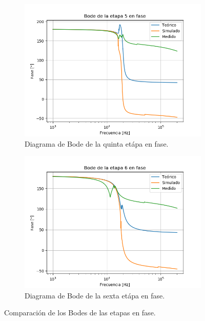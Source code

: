 \begin{figure}[H]
\begin{subfigure}{.49\textwidth}
	\includegraphics[width=\textwidth]{Imagenes/Pha-5.png}
	\caption{Diagrama de Bode de la quinta etápa en fase.}
	\label{fig:pha5}
\end{subfigure}
\centering
\begin{subfigure}{.49\textwidth}
\centering
	\includegraphics[width=\textwidth]{Imagenes/Pha-6.png}
	\caption{Diagrama de Bode de la sexta etápa en fase.}
	\label{fig:pha6}
\end{subfigure}
\caption{Comparación de los Bodes de las etapas en fase.}
\label{fig:bode-pha}
\end{figure}

